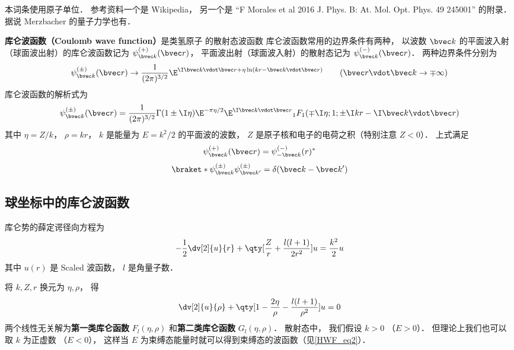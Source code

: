 

本词条使用原子单位． 参考资料一个是 Wikipedia， 另一个是 “F Morales et al 2016 J. Phys. B: At. Mol. Opt. Phys. 49 245001” 的附录． 据说 Merzbacher 的量子力学也有．

\textbf{库仑波函数（Coulomb wave function）}是类氢原子%
的散射态波函数%
库仑波函数常用的边界条件有两种， 以波数 $\bvec k$ 的平面波入射（球面波出射）的库仑波函数记为 $\psi_{\bvec k}^{(+)}(\bvec r)$， 平面波出射（球面波入射）的散射态记为 $\psi_{\bvec k}^{(-)}(\bvec r)$． 两种边界条件分别为
\begin{equation}
\psi_{\bvec k}^{(\pm)}(\bvec r) \to \frac{1}{(2\pi)^{3/2}} \E^{\I\bvec k\vdot\bvec r + \eta\ln (kr - \bvec k \vdot\bvec r)}
\qquad
(\bvec r\vdot \bvec k \to \mp\infty)
\end{equation}
库仑波函数的解析式为
\begin{equation}
\psi_{\bvec k}^{(\pm)}(\bvec r) = \frac{1}{(2\pi)^{3/2}} \Gamma(1\pm \I\eta)\E^{-\pi\eta/2} \E^{\I\bvec k\vdot\bvec r} {_1F_1}(\mp\I\eta; 1; \pm\I kr - \I \bvec k\vdot \bvec r)
\end{equation}
其中 $\eta = Z/k$， $\rho = kr$， $k$ 是能量为 $E = k^2/2$ 的平面波的波数， $Z$ 是原子核和电子的电荷之积（特别注意 $Z < 0$）． 上式满足
\begin{equation}
\psi_{\bvec k}^{(+)}(\bvec r) = \psi_{-\bvec k}^{(-)}(r)^*
\end{equation}
\begin{equation}
\braket*{\psi_{\bvec k}^{(\pm)}}{\psi_{\bvec k'}^{(\pm)}} = \delta(\bvec k - \bvec k')
\end{equation}

\subsection{球坐标中的库仑波函数}
库仑势的薛定谔径向方程为
\begin{equation}
-\frac12 \dv[2]{u}{r} + \qty[\frac{Z}{r} + \frac{l(l+1)}{2 r^2}]u = \frac{k^2}{2}u
\end{equation}
其中 $u(r)$ 是 Scaled 波函数， $l$ 是角量子数．

将 $k, Z, r$ 换元为 $\eta, \rho$， 得
\begin{equation}
\dv[2]{u}{\rho} + \qty[1 - \frac{2\eta}{\rho} - \frac{l(l+1)}{\rho^2}]u = 0
\end{equation}
两个线性无关解为\textbf{第一类库仑函数} $F_l(\eta, \rho)$ 和\textbf{第二类库仑函数} $G_l(\eta, \rho)$． 散射态中， 我们假设 $k > 0$ （$E > 0$）． 但理论上我们也可以取 $k$ 为正虚数 （$E < 0$）， 这样当 $E$ 为束缚态能量时就可以得到束缚态的波函数（见\autoref{HWF_eq2}）．


